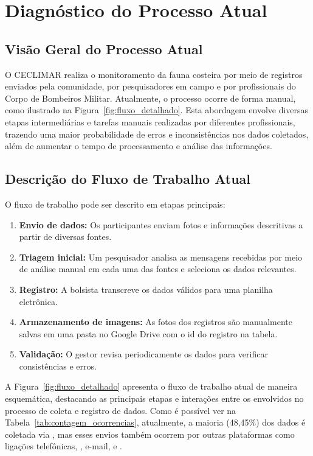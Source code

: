 \chapter{Diagnóstico do Processo Atual} \label{chapter:diagnostico}

\section{Visão Geral do Processo Atual}

O CECLIMAR realiza o monitoramento da fauna costeira por meio de registros enviados pela comunidade, 
por pesquisadores em campo e por profissionais do Corpo de Bombeiros Militar. Atualmente, o processo 
ocorre de forma manual, como ilustrado na Figura~\ref{fig:fluxo_detalhado}. Esta abordagem envolve 
diversas etapas intermediárias e tarefas manuais realizadas por diferentes profissionais, trazendo
uma maior probabilidade de erros e inconsistências nos dados coletados, além de aumentar o tempo
de processamento e análise das informações.

\section{Descrição do Fluxo de Trabalho Atual}

O fluxo de trabalho pode ser descrito em etapas principais:

\begin{enumerate}
    \item \textbf{Envio de dados:} Os participantes enviam fotos e informações descritivas a partir de diversas fontes.
    \item \textbf{Triagem inicial:} Um pesquisador analisa as mensagens recebidas por meio de análise manual em cada uma das fontes e seleciona os dados relevantes.
    \item \textbf{Registro:} A bolsista transcreve os dados válidos para uma planilha eletrônica.
    \item \textbf{Armazenamento de imagens:} As fotos dos registros são manualmente salvas em uma pasta no Google Drive com o id do registro na tabela.
    \item \textbf{Validação:} O gestor revisa periodicamente os dados para verificar consistências e erros.
\end{enumerate}

A Figura~\ref{fig:fluxo_detalhado} apresenta o fluxo de trabalho atual de maneira esquemática, 
destacando as principais etapas e interações entre os envolvidos no processo de coleta e registro de dados.
Como é possível ver na Tabela~\ref{tab:contagem_ocorrencias}, atualmente, a maioria (48,45\%) dos dados 
é coletada via , mas esses envios também ocorrem por outras plataformas 
como ligações telefônicas, , e-mail, e .

